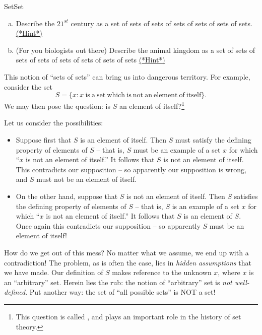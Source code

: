 \begin{exercise}{SetSet}
\begin{enumerate}[(a)]
\item
Describe the $21^{st}$ century as a set of sets of sets of sets of sets of sets of sets.
\hyperref[sec:set_chapter:hints]{(*Hint*)}
\item
(For you biologists out there)  Describe the animal kingdom as a set of sets of sets of sets of sets of sets of sets of sets
\hyperref[sec:set_chapter:hints]{(*Hint*)}
\end{enumerate}
\end{exercise}

This notion of ``sets of sets'' can bring us into dangerous territory. For example, consider the set 
\[S = \{ x : x \mathrm{~is~a~set~which~is~not~an~element~of~itself} \}. \]
We may then pose the question: is $S$ an element of itself?\footnote{This question is called , and plays an important role in the history of set theory.} 

Let us consider the possibilities:
\begin{itemize}
\item
 Suppose first that $S$ is an element of itself. 
Then $S$ must satisfy the defining property of elements of  $S$ -- that is, $S$ must be an example of a set $x$ for which ``$x$ is  not an element of itself.'' It follows that $S$ is not an element of itself.  This contradicts our supposition -- so apparently our supposition is wrong, and $S$ must not be an element of itself.
\item
On the other hand, suppose that $S$ is not an element of itself. Then $S$ satisfies the defining property of elements of  $S$ -- that is, $S$ is an example of a set $x$ for which ``$x$ is  not an element of itself.'' It follows that $S$ is an element of $S$.  Once again this contradicts our supposition -- so apparently $S$ must be an element of itself!
\end{itemize}
How do we get out of this mess? No matter what we assume, we end up with a contradiction! The problem, as is often the case, lies in  \emph{hidden assumptions} that we have made. Our definition of $S$ makes reference to the unknown $x$, where $x$ is an ``arbitrary'' set. Herein lies the rub:  the notion of ``arbitrary'' set is \emph{not well-defined}. Put another way: the set of ``all possible sets'' is NOT a set!

